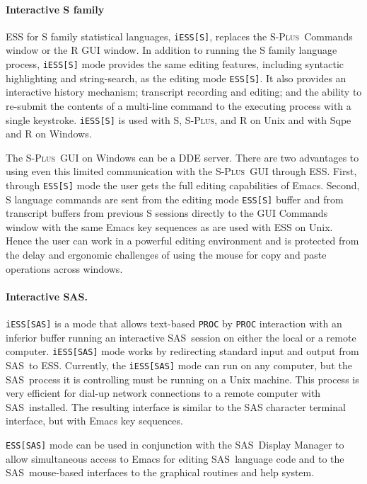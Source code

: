 \documentclass{article}
\newcommand*{\SAS}{\textsc{SAS}}
\newcommand*{\Splus}{\textsc{S-Plus}}
\newcommand{\stexttt}[1]{{\small\texttt{#1}}}
\begin{document}
\paragraph{Interactive S family}
ESS for S family statistical languages, \stexttt{iESS[S]},
replaces the \Splus\ Commands window or the R GUI window.  In addition
to running the S family language process, \stexttt{iESS[S]} mode provides the
same editing features, including syntactic highlighting and
string-search, as the editing mode \stexttt{ESS[S]}.  It also provides
an interactive history mechanism; transcript recording and editing;
and the ability to re-submit the contents of a multi-line command to
the executing process with a single keystroke.  \stexttt{iESS[S]} is
used with S, \Splus, and R on Unix and with Sqpe and R on Windows.

The \Splus\ GUI on Windows can be a DDE server.  There are two
advantages to using even this limited communication with the \Splus\
GUI through ESS.  First, through \stexttt{ESS[S]} mode the user gets
the full editing capabilities of Emacs.  Second, S language commands
are sent from the editing mode \stexttt{ESS[S]} buffer and from
transcript buffers from previous S sessions directly to the GUI
Commands window with the same Emacs key sequences as are used with ESS
on Unix.  Hence the user can work in a powerful editing environment
and is protected from the delay and ergonomic challenges of using the
mouse for copy and paste operations across windows.

\paragraph{Interactive \SAS.}
\stexttt{iESS[SAS]} is a mode that allows text-based \stexttt{PROC} by
\stexttt{PROC} interaction with an inferior buffer running an
interactive \SAS\ session on either the local or a remote computer.
\stexttt{iESS[SAS]} mode works by redirecting standard input and
output from \SAS\ to ESS.  Currently, the \stexttt{iESS[SAS]} mode can
run on any computer, but the \SAS\ process it is controlling must be
running on a Unix machine.  This process is very efficient for dial-up
network connections to a remote computer with \SAS\ installed.  The
resulting interface is similar to the SAS character terminal
interface, but with Emacs key sequences.

%
%
\stexttt{ESS[SAS]} mode can be used in conjunction with the \SAS\
Display Manager to allow simultaneous access to Emacs for editing
\SAS\ language code and to the \SAS\ mouse-based interfaces to the
graphical routines and help system.
\end{document}
